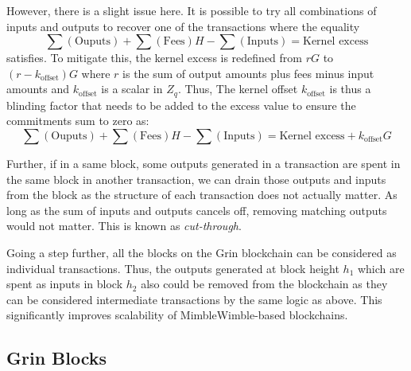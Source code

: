 \noindent
However, there is a slight issue here. 
It is possible to try all combinations of inputs and outputs to recover one of the transactions where the equality 
$$\sum (\text{Ouputs}) + \sum (\text{Fees})H - \sum (\text{Inputs}) = \text{Kernel excess}$$
satisfies. To mitigate this, the kernel excess is redefined from $rG$ to $(r-k_{\text{offset}})G$ where $r$ is the sum of output amounts plus fees minus input amounts and $k_{\text{offset}}$ is a scalar in $Z_q$.
Thus, The kernel offset $k_{\text{offset}}$ is thus a blinding factor that needs to be added to the excess value to ensure the commitments sum to zero as:
\begin{equation*}
  \sum (\text{Ouputs}) + \sum (\text{Fees})H - \sum (\text{Inputs}) = \text{Kernel excess} + k_{\text{offset}}G
\end{equation*}

Further, if in a same block, some outputs generated in a transaction are spent in the same block in another transaction, we can drain those outputs and inputs from the block as the structure of each transaction does not actually matter.
As long as the sum of inputs and outputs cancels off, removing matching outputs would not matter. 
This is known as \textit{cut-through}. 

Going a step further, all the blocks on the Grin blockchain can be considered as individual transactions. 
Thus, the outputs generated at block height $h_1$ which are spent as inputs in block $h_2$ also could be removed from the blockchain as they can be considered intermediate transactions by the same logic as above.
This significantly improves scalability of MimbleWimble-based blockchains.  

\subsection{Grin Blocks}
\label{scn:GrinOverview}

